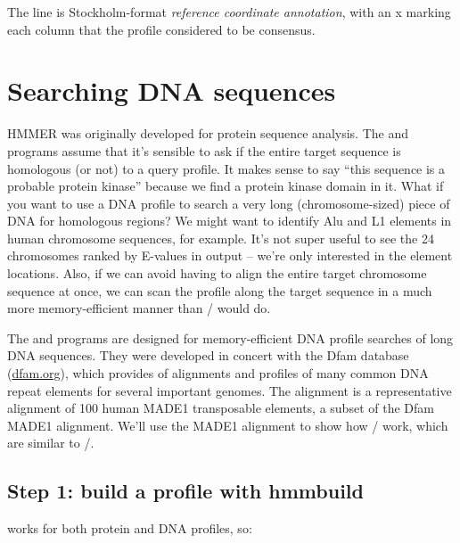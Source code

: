 The  line is Stockholm-format \emph{reference
  coordinate annotation}, with an x marking each column that the
profile considered to be consensus.



\section{Searching DNA sequences}

HMMER was originally developed for protein sequence analysis. The
 and  programs assume that it's sensible
to ask if the entire target sequence is homologous (or not) to a query
profile. It makes sense to say ``this sequence is a probable protein
kinase'' because we find a protein kinase domain in it.  What if you
want to use a DNA profile to search a very long (chromosome-sized)
piece of DNA for homologous regions?  We might want to identify Alu
and L1 elements in human chromosome sequences, for example. It's not
super useful to see the 24 chromosomes ranked by E-values in
 output -- we're only interested in the element
locations. Also, if we can avoid having to align the entire target
chromosome sequence at once, we can scan the profile along the target
sequence in a much more memory-efficient manner than
/ would do.

The  and  programs are designed for
memory-efficient DNA profile searches of long DNA sequences. They were
developed in concert with the Dfam database (\url{dfam.org}), which
provides of alignments and profiles of many common DNA repeat elements
for several important genomes.  The alignment
 is a representative alignment of 100 human
MADE1 transposable elements, a subset of the Dfam MADE1
alignment. We'll use the MADE1 alignment to show how
/ work, which are similar to
/.

\subsection{Step 1: build a profile with hmmbuild}

 works for both protein and DNA profiles, so:

   \vspace{1ex}
   \vspace{1ex}

